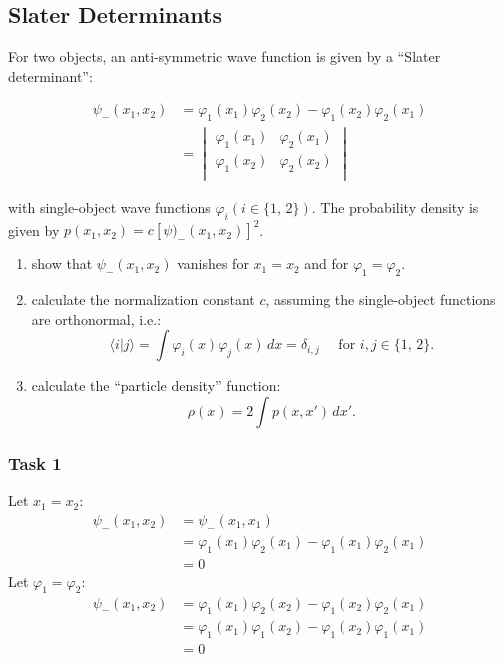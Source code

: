 \documentclass{article}
\let\phi\varphi
\begin{document}
  \subsection{Slater Determinants}
  \begin{centerframebox}
    For two objects, an anti-symmetric wave function is given by a ``Slater determinant'':

    \begin{align*}
      \psi_{-}(x_{1},x_{2}) &= \varphi_{1}(x_{1})\varphi_{2}(x_{2})-\varphi_{1}(x_{2})\varphi_{2}(x_{1})   \\
      &= \begin{vmatrix}
        \phi_1(x_1) & \phi_2(x_1) \\
        \phi_1(x_2) & \phi_2(x_2) \\
      \end{vmatrix}
    \end{align*}

    with single-object wave functions $\phi_i (i \in \{1,\, 2\})$.
    The probability density is given by $p(x_1, x_2) = c [\psi)_{-}(x_1, x_2)]^2$.

    \begin{enumerate}[label=\underline{Task \arabic*:},itemindent=0.5cm]
      \item show that $\psi_{-}(x_1, x_2)$ vanishes for $x_1 = x_2$ and for $\phi_1 = \phi_2$.
      \item calculate the normalization constant $c$, assuming the single-object functions are orthonormal, i.e.:
      \[ \langle i|j\rangle = \int\phi_i(x)\phi_j(x)\, dx = \delta_{i,j} \quad\textrm{ for } i,j \in \{1,\, 2\}. \]
      \item calculate the ``particle density'' function:
      \[ \rho(x) = 2\int p(x,x')\, dx'. \]
    \end{enumerate}
  \end{centerframebox}

  \subsubsection{Task 1}
  Let $x_1 = x_2$:
  \begin{align*}
      \psi_-(x_1, x_2) &= \psi_-(x_1, x_1)\\
      &= \varphi_1(x_1)\varphi_2(x_1) - \varphi_1(x_1)\varphi_2(x_1)\\
      &= 0
  \end{align*}
  Let $\varphi_1 = \varphi_2$:
  \begin{align*}
      \psi_-(x_1, x_2) &= \varphi_1(x_1)\varphi_2(x_2) - \varphi_1(x_2)\varphi_2(x_1)\\
      &= \varphi_1(x_1)\varphi_1(x_2) - \varphi_1(x_2)\varphi_1(x_1)\\
      &= 0
  \end{align*}
\end{document}
